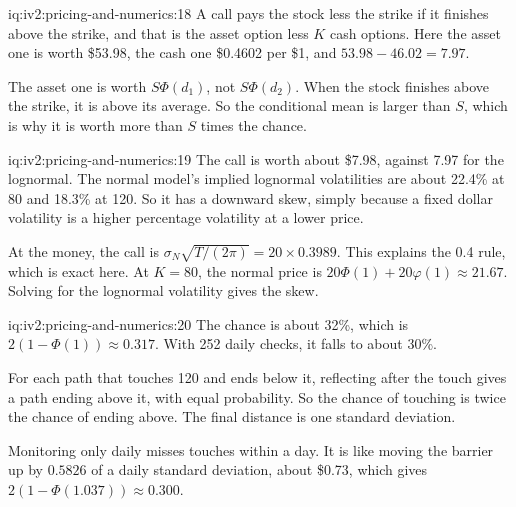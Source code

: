 \begin{solution}{iq:iv2:pricing-and-numerics:18}
A call pays the stock less the strike if it finishes above the strike, and that is the asset option less $K$ cash options. Here the asset one is worth \$53.98, the cash one \$0.4602 per \$1, and $53.98 - 46.02 = 7.97$.

The asset one is worth $S\Phi(d_1)$, not $S\Phi(d_2)$. When the stock finishes above the strike, it is above its average. So the conditional mean is larger than $S$, which is why it is worth more than $S$ times the chance.

\end{solution}

\begin{solution}{iq:iv2:pricing-and-numerics:19}
The call is worth about \$7.98, against 7.97 for the lognormal. The normal model's implied lognormal volatilities are about 22.4\% at 80 and 18.3\% at 120. So it has a downward skew, simply because a fixed dollar volatility is a higher percentage volatility at a lower price.

At the money, the call is $\sigma_N\sqrt{T/(2\pi)} = 20 \times 0.3989$. This explains the 0.4 rule, which is exact here. At $K = 80$, the normal price is $20\Phi(1) + 20\varphi(1) \approx 21.67$. Solving for the lognormal volatility gives the skew.

\end{solution}

\begin{solution}{iq:iv2:pricing-and-numerics:20}
The chance is about 32\%, which is $2(1 - \Phi(1)) \approx 0.317$. With 252 daily checks, it falls to about 30\%.

For each path that touches 120 and ends below it, reflecting after the touch gives a path ending above it, with equal probability. So the chance of touching is twice the chance of ending above. The final distance is one standard deviation.

Monitoring only daily misses touches within a day. It is like moving the barrier up by $0.5826$ of a daily standard deviation, about \$0.73, which gives $2(1 - \Phi(1.037)) \approx 0.300$.

\end{solution}

